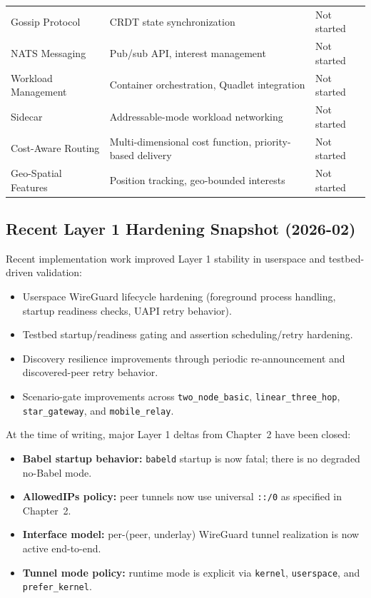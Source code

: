 \begin{longtable}{@{}p{4cm}p{6.5cm}p{2.5cm}@{}}
Gossip Protocol & CRDT state synchronization & Not started \\
NATS Messaging & Pub/sub API, interest management & Not started \\
Workload Management & Container orchestration, Quadlet integration & Not started \\
Sidecar & Addressable-mode workload networking & Not started \\
Cost-Aware Routing & Multi-dimensional cost function, priority-based delivery & Not started \\
Geo-Spatial Features & Position tracking, geo-bounded interests & Not started \\
\bottomrule
\end{longtable}

\subsection{Recent Layer 1 Hardening Snapshot (2026-02)}

Recent implementation work improved Layer 1 stability in userspace and testbed-driven validation:

\begin{itemize}[nosep]
    \item Userspace WireGuard lifecycle hardening (foreground process handling, startup readiness checks, UAPI retry behavior).
    \item Testbed startup/readiness gating and assertion scheduling/retry hardening.
    \item Discovery resilience improvements through periodic re-announcement and discovered-peer retry behavior.
    \item Scenario-gate improvements across \texttt{two\_node\_basic}, \texttt{linear\_three\_hop}, \texttt{star\_gateway}, and \texttt{mobile\_relay}.
\end{itemize}

At the time of writing, major Layer 1 deltas from Chapter~2 have been closed:

\begin{itemize}[nosep]
    \item \textbf{Babel startup behavior:} \texttt{babeld} startup is now fatal; there is no degraded no-Babel mode.
    \item \textbf{AllowedIPs policy:} peer tunnels now use universal \texttt{::/0} as specified in Chapter~2.
    \item \textbf{Interface model:} per-(peer, underlay) WireGuard tunnel realization is now active end-to-end.
    \item \textbf{Tunnel mode policy:} runtime mode is explicit via \texttt{kernel}, \texttt{userspace}, and \texttt{prefer\_kernel}.
\end{itemize}

